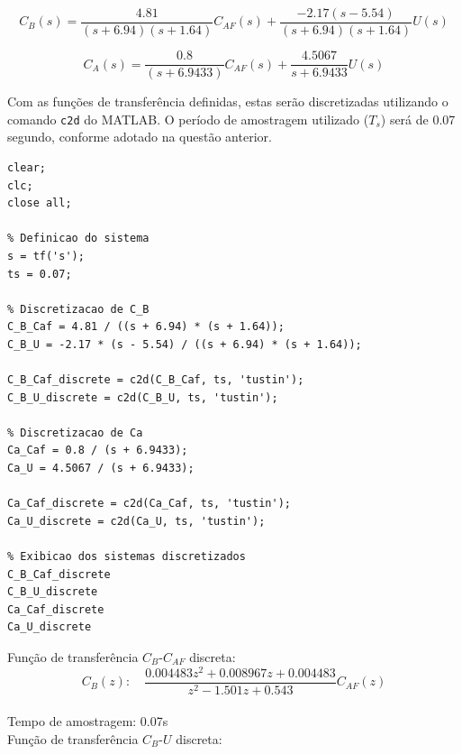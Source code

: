 \documentclass[a4paper,12pt]{article}
\begin{document}
\begin{equation}
C_B(s) = \frac{4.81}{(s+6.94)(s+1.64)}C_{AF}(s) +\frac{-2.17(s-5.54)}{(s+6.94)(s+1.64)} U(s)
\label{eq:planta_cb}
\end{equation}

\begin{equation}
C_A(s) = \frac{0.8}{(s+6.9433)}C_{AF}(s) +\frac{4.5067}{s+6.9433} U(s)
\label{eq:planta_ca}
\end{equation}

Com as funções de transferência definidas, estas serão discretizadas utilizando o comando \texttt{c2d} do MATLAB. O período de amostragem utilizado ($T_s$) será de 0.07 segundo, conforme adotado na questão anterior.\\



\begin{lstlisting}
clear;
clc;
close all;

% Definicao do sistema
s = tf('s');
ts = 0.07;

% Discretizacao de C_B
C_B_Caf = 4.81 / ((s + 6.94) * (s + 1.64));
C_B_U = -2.17 * (s - 5.54) / ((s + 6.94) * (s + 1.64));

C_B_Caf_discrete = c2d(C_B_Caf, ts, 'tustin');
C_B_U_discrete = c2d(C_B_U, ts, 'tustin');

% Discretizacao de Ca
Ca_Caf = 0.8 / (s + 6.9433);
Ca_U = 4.5067 / (s + 6.9433);

Ca_Caf_discrete = c2d(Ca_Caf, ts, 'tustin');
Ca_U_discrete = c2d(Ca_U, ts, 'tustin');

% Exibicao dos sistemas discretizados
C_B_Caf_discrete
C_B_U_discrete
Ca_Caf_discrete
Ca_U_discrete
\end{lstlisting}


Função de transferência $C_B$-$C_{AF}$ discreta:\\

\begin{equation}
C_B(z): \quad \frac{0.004483 z^2 + 0.008967 z + 0.004483}{z^2 - 1.501 z + 0.543}C_{AF}(z)
\end{equation}\\

Tempo de amostragem: 0.07s\\

Função de transferência $C_B$-$U$ discreta:
\end{document}
